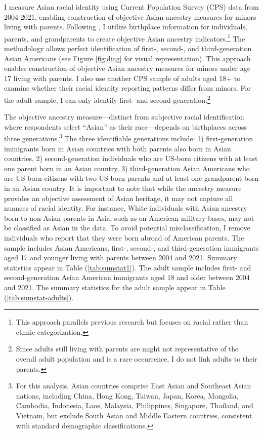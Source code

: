 I measure Asian racial identity using Current Population Survey (CPS) data from 2004-2021, enabling construction of objective Asian ancestry measures for minors living with parents. Following \textcite{antmanEthnicAttritionObserved2016,antmanEthnicAttritionAssimilation2020}, I utilize birthplace information for individuals, parents, and grandparents to create objective Asian ancestry indicators.\footnote{This approach parallels previous research but focuses on racial rather than ethnic categorization.} The methodology allows perfect identification of first-, second-, and third-generation Asian Americans (see Figure \ref{fig:diag} for visual representation). This approach enables construction of objective Asian ancestry measures for minors under age 17 living with parents. I also use another CPS sample of adults aged 18+ to examine whether their racial identity reporting patterns differ from minors. For the adult sample, I can only identify first- and second-generation.\footnote{Since adults still living with parents are might not representative of the overall adult population and is a rare occurrence, I do not link adults to their parents.}

The objective ancestry measure—distinct from subjective racial identification where respondents select ``Asian'' as their race—depends on birthplaces across three generations.\footnote{For this analysis, Asian countries comprise East Asian and Southeast Asian nations, including China, Hong Kong, Taiwan, Japan, Korea, Mongolia, Cambodia, Indonesia, Laos, Malaysia, Philippines, Singapore, Thailand, and Vietnam, but exclude South Asian and Middle Eastern countries, consistent with standard demographic classifications.} The three identifiable generations include: 1) first-generation immigrants born in Asian countries with both parents also born in Asian countries, 2) second-generation individuals who are US-born citizens with at least one parent born in an Asian country, 3) third-generation Asian Americans who are US-born citizens with two US-born parents and at least one grandparent born in an Asian country. It is important to note that while the ancestry measure provides an objective assessment of Asian heritage, it may not capture all nuances of racial identity. For instance, White individuals with Asian ancestry born to non-Asian parents in Asia, such as on American military bases, may not be classified as Asian in the data. To avoid potential misclassification, I remove individuals who report that they were born abroad of American parents. The sample includes Asian Americans, first-, second-, and third-generation immigrants aged 17 and younger living with parents between 2004 and 2021. Summary statistics appear in Table (\ref{tab:sumstat1}). The adult sample includes first- and second-generation Asian American immigrants aged 18 and older between 2004 and 2021. The summary statistics for the adult sample appear in Table (\ref{tab:sumstat-adults}). 

